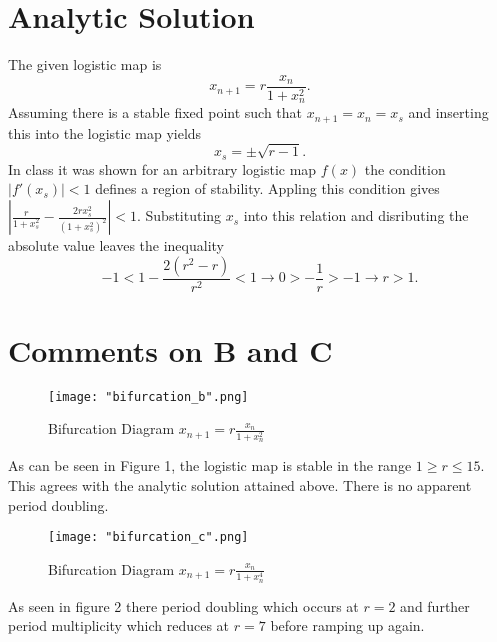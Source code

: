 \documentclass[12pt, oneside]{article}
\begin{document}
	\section*{Analytic Solution}
	
	The given logistic map is
	\begin{equation*}
	x_{n+1}=r\frac{x_n}{1+x_n^2}.
	\end{equation*}
	Assuming there is a stable fixed point such that \(x_{n+1}=x_{n}=x_s\) and inserting this into the logistic map yields
	\begin{equation*}
	x_s=\pm\sqrt{r-1}.
	\end{equation*}
	In class it was shown for an arbitrary logistic map \(f(x)\) the condition \(|f'(x_s)|<1\) defines a region of stability. Appling this condition gives \(|\frac{r}{1+x_s^2}-\frac{2rx_s^2}{(1+x_s^2)^2}|<1\). Substituting \(x_s\) into this relation and disributing the absolute value leaves the inequality
	\begin{equation*}
	-1<1-\frac{2(r^2-r)}{r^2}<1\rightarrow 0>-\frac{1}{r}>-1\rightarrow r>1.
	\end{equation*}
\section*{Comments on B and C}

\begin{figure}[H]
	\centering
	\texttt{[image: "bifurcation\_b".png]}
	\label{0}
	\caption{Bifurcation Diagram \(x_{n+1}=r\frac{x_n}{1+x_n^2}\)}
	\end{figure}
	As can be seen in Figure 1, the logistic map is stable in the range \(1\geq r \leq 15\). This agrees with the analytic solution attained above. There is no apparent period doubling.
\begin{figure}[H]
	\centering
	\texttt{[image: "bifurcation\_c".png]}
	\label{0}
	\caption{Bifurcation Diagram \(x_{n+1}=r\frac{x_n}{1+x_n^4}\)}
\end{figure}	
As seen in figure 2 there period doubling which occurs at \(r=2\) and further period multiplicity which reduces at \(r=7 \) before ramping up again.
\end{document}
